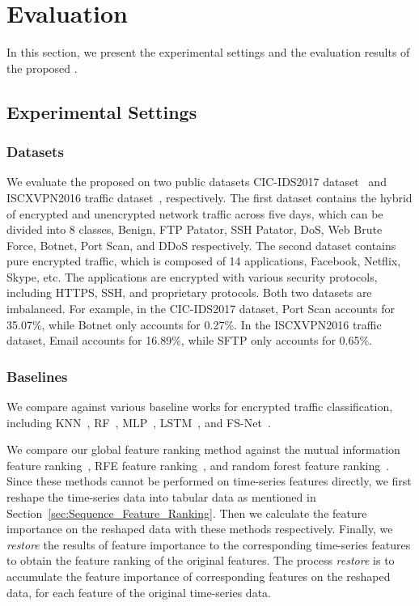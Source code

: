 \section{Evaluation}
\label{sec:Evaluation}
In this section, we present the experimental settings and the evaluation results of the proposed \sys.

\subsection{Experimental Settings}
\subsubsection{Datasets}
We evaluate the proposed \sys on two public datasets CIC-IDS2017 dataset~\cite{sharafaldin2018toward} and ISCXVPN2016 traffic dataset~\cite{draper2016characterization}, respectively. 
The first dataset contains the hybrid of encrypted and unencrypted network traffic across five days, which can be divided into 8 classes, Benign, FTP Patator, SSH Patator, DoS, Web Brute Force, Botnet, Port Scan, and DDoS respectively.
The second dataset contains pure encrypted traffic, which is composed of 14 applications, \eg Facebook, Netflix, Skype, etc.
The applications are encrypted with various security protocols, including HTTPS, SSH, and proprietary protocols.
Both two datasets are imbalanced.
For example, in the CIC-IDS2017 dataset, Port Scan accounts for 35.07\%, while Botnet only accounts for 0.27\%.
In the ISCXVPN2016 traffic dataset, Email accounts for 16.89\%, while SFTP only accounts for 0.65\%. 

\subsubsection{Baselines}
We compare \sys against various baseline works for encrypted traffic classification, including KNN~\cite{mcgaughey2018systematic}, RF~\cite{zhai2018random}, MLP~\cite{aceto2018mobile}, LSTM~\cite{vu2018time}, and FS-Net~\cite{liu2019fs}. 

We compare our global feature ranking method against the mutual information feature ranking~\cite{kraskov2004estimating}, RFE feature ranking~\cite{guyon2002gene}, and random forest feature ranking~\cite{louppe2014understanding}.  
Since these methods cannot be performed on time-series features directly, we first reshape the time-series data into tabular data as mentioned in Section~\ref{sec:Sequence_Feature_Ranking}.
Then we calculate the feature importance on the reshaped data with these methods respectively.  
Finally, we \emph{restore} the results of feature importance to the corresponding time-series features to obtain the feature ranking of the original features.
The process \emph{restore} is to accumulate the feature importance of corresponding features on the reshaped data, for each feature of the original time-series data.

